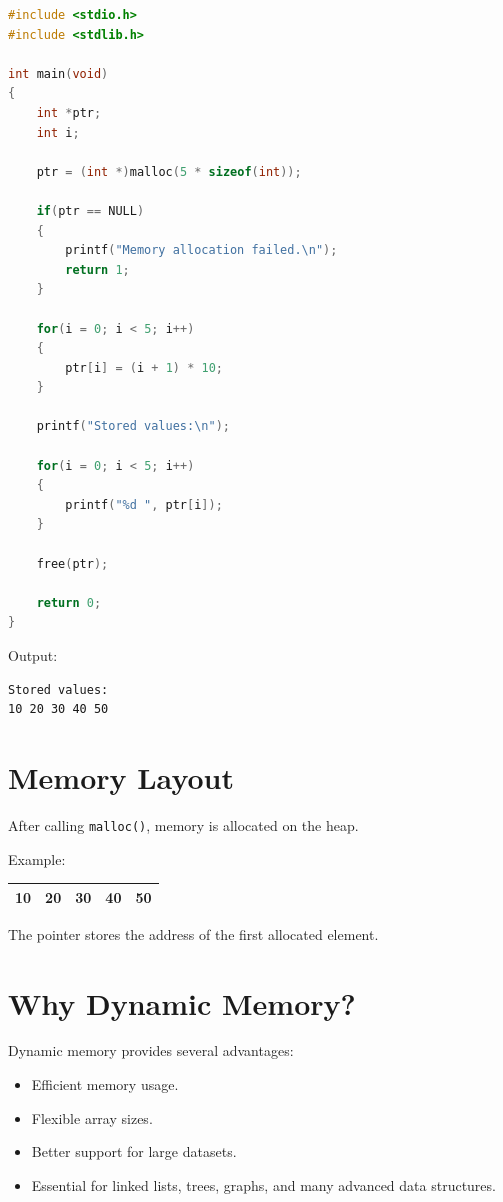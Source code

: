 \documentclass[12pt,openany]{book}
\begin{document}
\begin{lstlisting}[language=C]
#include <stdio.h>
#include <stdlib.h>

int main(void)
{
    int *ptr;
    int i;

    ptr = (int *)malloc(5 * sizeof(int));

    if(ptr == NULL)
    {
        printf("Memory allocation failed.\n");
        return 1;
    }

    for(i = 0; i < 5; i++)
    {
        ptr[i] = (i + 1) * 10;
    }

    printf("Stored values:\n");

    for(i = 0; i < 5; i++)
    {
        printf("%d ", ptr[i]);
    }

    free(ptr);

    return 0;
}
\end{lstlisting}

Output:

\begin{lstlisting}
Stored values:
10 20 30 40 50
\end{lstlisting}

\section{Memory Layout}

After calling \texttt{malloc()}, memory is allocated on the heap.

Example:

\begin{center}
\begin{tabular}{|c|c|c|c|c|}
\hline
10 & 20 & 30 & 40 & 50 \\
\hline
\end{tabular}
\end{center}

The pointer stores the address of the first allocated element.

\section{Why Dynamic Memory?}

Dynamic memory provides several advantages:

\begin{itemize}
    \item Efficient memory usage.
    \item Flexible array sizes.
    \item Better support for large datasets.
    \item Essential for linked lists, trees, graphs, and many advanced data structures.
\end{itemize}
\end{document}
